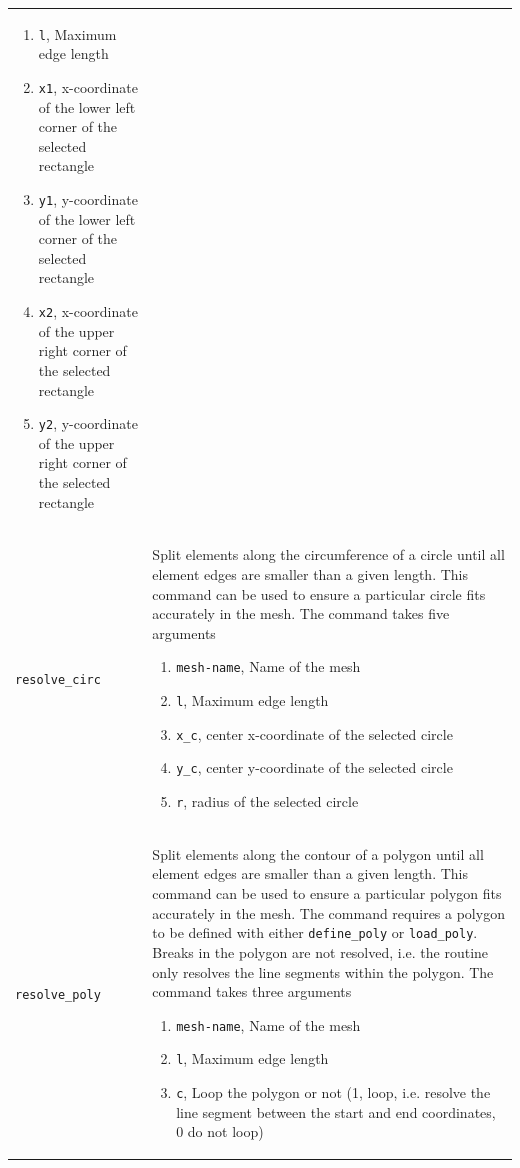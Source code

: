 \documentclass[noshowpacs,preprintnumbers,amsmath,amssymb, letter]{revtex4}
\begin{document}
\begin{longtable}{p{}p{}}
\begin{enumerate}
\item \texttt{l}, Maximum edge length
\item \texttt{x1}, x-coordinate of the lower left corner of the selected rectangle
\item \texttt{y1}, y-coordinate of the lower left corner of the selected rectangle
\item \texttt{x2}, x-coordinate of the upper right corner of the selected rectangle
\item \texttt{y2}, y-coordinate of the upper right corner of the selected rectangle
\end{enumerate}\\
\texttt{resolve\_circ}	& Split elements along the circumference of a circle until all element edges are smaller than a given length. This command can be used to ensure a particular circle fits accurately in the mesh. The command takes five arguments 
\begin{enumerate}
\item \texttt{mesh-name}, Name of the mesh
\item \texttt{l}, Maximum edge length
\item \texttt{x\_c}, center x-coordinate of the selected circle
\item \texttt{y\_c}, center y-coordinate of the selected circle
\item \texttt{r}, radius of the selected circle
\end{enumerate}\\
\texttt{resolve\_poly}	& Split elements along the contour of a polygon until all element edges are smaller than a given length. This command can be used to ensure a particular polygon fits accurately in the mesh. The command requires a polygon to be defined with either \texttt{define\_poly} or \texttt{load\_poly}. Breaks in the polygon are not resolved, i.e. the routine only resolves the line segments within the polygon. The command takes three arguments 
\begin{enumerate}
\item \texttt{mesh-name}, Name of the mesh
\item \texttt{l}, Maximum edge length
\item \texttt{c}, Loop the polygon or not (1, loop, i.e. resolve the line segment between the start and end coordinates, 0 do not loop)
\end{enumerate}\\

\end{longtable}
\end{document}
